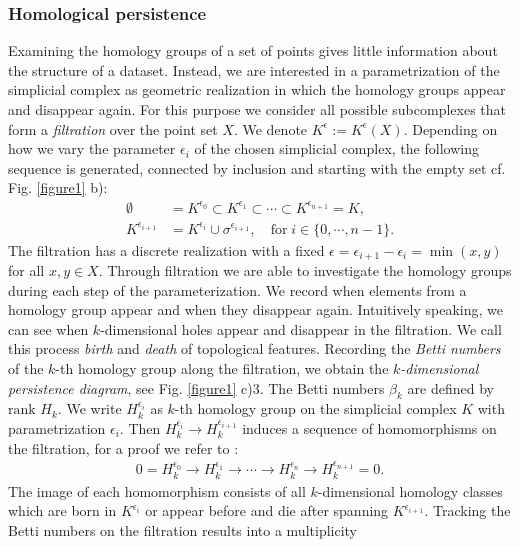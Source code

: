 \documentclass[runningheads,orivec]{llncs}
\begin{document}
\subsubsection{Homological persistence} Examining the homology groups of a set of points gives little information about the structure of a dataset. Instead, we are interested in a parametrization of the simplicial complex as geometric realization in which the homology groups appear and disappear again. For this purpose we consider all possible subcomplexes that form a \emph{filtration} over the point set $X$. We denote $K^{\epsilon} := K^{\epsilon}(X)$. Depending on how we vary the parameter $\epsilon_i$ of the chosen simplicial complex, the following sequence is generated, connected by inclusion and starting with the empty set cf. Fig. \ref{figure1} b):
\begin{align}
    \emptyset &= K^{\epsilon_0} \subset K^{\epsilon_1} \subset \cdots \subset K^{\epsilon_{n+1}}= K,\\
    K^{\epsilon_{i+1}} &= K^{\epsilon_i} \cup \sigma^{\epsilon_{i+1}}, \quad \text{for} \; i \in \{0, \cdots, n-1\}.
\end{align}
The filtration has a discrete realization with a fixed $\epsilon = \epsilon_{i+1}-\epsilon_{i} = \min(x,y)$ for all $x,y \in X$. Through filtration we are able to investigate the homology groups during each step of the parameterization. We record when elements from a homology group appear and when they disappear again. Intuitively speaking, we can see when $k$-dimensional holes appear and disappear in the filtration. We call this process \emph{birth} and \emph{death} of topological features. Recording the \emph{Betti numbers} of the $k$-th homology group along the filtration, we obtain the \emph{$k$-dimensional persistence diagram}, see Fig. \ref{figure1} c)3. The Betti numbers $\beta_k$ are defined by $\text{rank } H_k$. We write $H^{\epsilon_i}_k$ as $k$-th homology group on the simplicial complex $K$ with parametrization $\epsilon_i$. Then $H^{\epsilon_{i}}_{k} \rightarrow H^{\epsilon_{i+1}}_k$ induces a sequence of homomorphisms on the filtration, for a proof we refer to \cite{edelsbrunner2008persistent}:
\begin{align}
0 = H^{\epsilon_{0}}_k \rightarrow H^{\epsilon_{1}}_k \rightarrow \cdots \rightarrow H^{\epsilon_{n}}_k \rightarrow H^{\epsilon_{n+1}}_k = 0.
\end{align}
The image of each homomorphism consists of all $k$-dimensional homology classes which are born in $K^{\epsilon_i}$ or appear before and die after spanning $K^{\epsilon_{i+1}}$. Tracking the Betti numbers on the filtration results into a multiplicity
\end{document}
